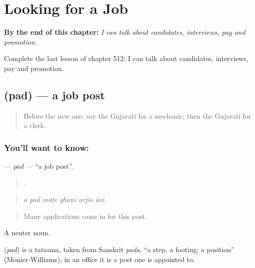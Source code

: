 
\chapter{Looking for a Job}
\label{ch:gu-looking-for-a-job}

\begin{chapteropening}
\textbf{By the end of this chapter:} \emph{I can talk about candidates, interviews, pay and promotion.}

Complete the last lesson of chapter 512: I can talk about candidates, interviews, pay and promotion.
\end{chapteropening}

\section[\texorpdfstring{\gu{પદ} (pad)}{પદ (pad)}]{ (pad) — a job post}

\label{lesson:GU-C512-pad}



\begin{quote}
Before the new one: say the Gujarati for a mechanic, then the Gujarati for a clerk.
\end{quote}

\subsection*{You'll want to know: }
\textbf{} — \emph{pad} — \textquotedblleft{}a job post\textquotedblright{}.

\begin{quote}
     .
\end{quote}

\begin{quote}
\emph{ā pad māṭe ghaṇī arjīo āvī.}
\end{quote}

\begin{quote}
Many applications came in for this post.
\end{quote}

A neuter noun.

\begin{cousinweb}
\textbf{} (\emph{pad}) is a tatsama, taken from Sanskrit \emph{pada}, \textquotedblleft{}a step, a footing; a position\textquotedblright{} (Monier-Williams); in an office it is a post one is appointed to.
\end{cousinweb}

